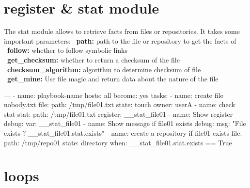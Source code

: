 \documentclass{refcard}
\begin{document}
\section{register \& stat module}

The stat module allows to retrieve facts from files or repositories. It takes some important parameters:
\textbullet\ \textbf{path:} path to the file or repository to get the facts of\\
\textbullet\ \textbf{follow:} whether to follow symbolic links\\
\textbullet\ \textbf{get\_checksum:} whether to return a checksum of the file\\
\textbullet\ \textbf{checksum\_algorithm:} algorithm to determine checksum of file\\
\textbullet\ \textbf{get\_mine:} Use file magic and return data about the nature of the file\\

\begin{yamlbox}[title={playbook register/stat}]
---
- name: playbook-name
  hosts: all
  become: yes
  tasks:
  - name: create file nobody.txt
    file:
      path: /tmp/file01.txt
      state: touch
      owner: userA
  - name: check stat
    stat:
      path: /tmp/file01.txt
    register: __stat_file01
  - name: Show register
    debug:
      var: __stat_file01 
  - name: Show message if file01 exists
    debug:
      msg: "File exists ? {{__stat_file01.stat.exists}}"
  - name: create a repository if file01 exists
    file:
      path: /tmp/repo01
      state: directory
    when: __stat_file01.stat.exists == True
\end{yamlbox}

\section{loops}
\end{document}
